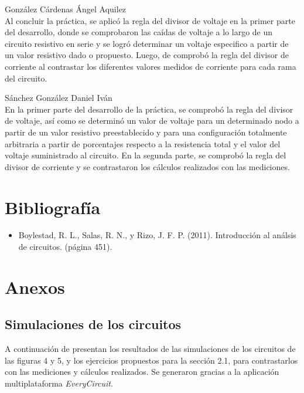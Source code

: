 \documentclass[a4paper,12pt]{article}
\begin{document}
\vspace{.5cm}

{\Large González Cárdenas Ángel Aquilez}\\
\vspace{.3cm}
Al concluir la práctica, se aplicó la regla del divisor de voltaje en la primer parte del desarrollo, donde se comprobaron las caídas de voltaje a lo largo de un circuito resistivo en serie y se logró determinar un voltaje especifico a partir de un valor resistivo dado o propuesto. Luego, de comprobó la regla del divisor de corriente al contrastar los diferentes valores medidos de corriente para cada rama del circuito.\par

\vspace{1cm}

{\Large Sánchez González Daniel Iván}\\
\vspace{.3cm}
En la primer parte del desarrollo de la práctica, se comprobó la regla del divisor de voltaje, así como se determinó un valor de voltaje para un determinado nodo a partir de un valor resistivo preestablecido y para una configuración totalmente arbitraria a partir de porcentajes respecto a la resistencia total y el valor del voltaje suministrado al circuito.
En la segunda parte, se comprobó la regla del divisor de corriente y se contrastaron los cálculos realizados con las mediciones.\par

\section{Bibliografía}

\begin{itemize}
\item Boylestad, R. L., Salas, R. N., y Rizo, J. F. P. (2011). Introducción al análsis de circuitos. (página 451).
\end{itemize}

\section{Anexos}
\subsection{Simulaciones de los circuitos}

A continuación de presentan los resultados de las simulaciones de los circuitos de las figuras 4 y 5, y los ejercicios propuestos para la sección 2.1, para contrastarlos con las mediciones y cálculos realizados. Se generaron gracias a la aplicación multiplataforma \textit{EveryCircuit}\texttrademark. \\
\end{document}
